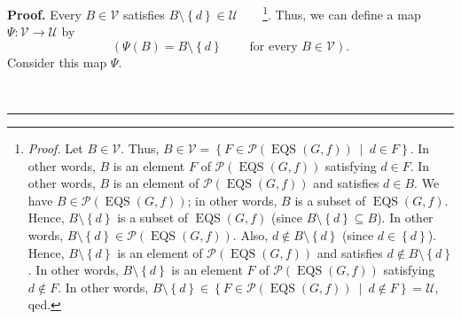 \documentclass[numbers=enddot,12pt,final,onecolumn,notitlepage]{scrartcl}%
\theoremstyle{definition}
\newenvironment{proof}[1][Proof]{\noindent\textbf{#1.} }{\ \rule{0.5em}{0.5em}}
\newenvironment{verlong}{}{}
\begin{document}
\begin{proof}
\begin{verlong}
Every $B\in\mathcal{V}$ satisfies $B\setminus\left\{  d\right\}
\in\mathcal{U}$\ \ \ \ \footnote{\textit{Proof.} Let $B\in\mathcal{V}$. Thus,
$B\in\mathcal{V}=\left\{  F\in\mathcal{P}\left(  \operatorname*{EQS}\left(
G,f\right)  \right)  \ \mid\ d\in F\right\}  $. In other words, $B$ is an
element $F$ of $\mathcal{P}\left(  \operatorname*{EQS}\left(  G,f\right)
\right)  $ satisfying $d\in F$. In other words, $B$ is an element of
$\mathcal{P}\left(  \operatorname*{EQS}\left(  G,f\right)  \right)  $ and
satisfies $d\in B$. We have $B\in\mathcal{P}\left(  \operatorname*{EQS}\left(
G,f\right)  \right)  $; in other words, $B$ is a subset of
$\operatorname*{EQS}\left(  G,f\right)  $. Hence, $B\setminus\left\{
d\right\}  $ is a subset of $\operatorname*{EQS}\left(  G,f\right)  $ (since
$B\setminus\left\{  d\right\}  \subseteq B$). In other words, $B\setminus
\left\{  d\right\}  \in\mathcal{P}\left(  \operatorname*{EQS}\left(
G,f\right)  \right)  $. Also, $d\notin B\setminus\left\{  d\right\}  $ (since
$d\in\left\{  d\right\}  $). Hence, $B\setminus\left\{  d\right\}  $ is an
element of $\mathcal{P}\left(  \operatorname*{EQS}\left(  G,f\right)  \right)
$ and satisfies $d\notin B\setminus\left\{  d\right\}  $. In other words,
$B\setminus\left\{  d\right\}  $ is an element $F$ of $\mathcal{P}\left(
\operatorname*{EQS}\left(  G,f\right)  \right)  $ satisfying $d\notin F$. In
other words, $B\setminus\left\{  d\right\}  \in\left\{  F\in\mathcal{P}\left(
\operatorname*{EQS}\left(  G,f\right)  \right)  \ \mid\ d\notin F\right\}
=\mathcal{U}$, qed.}. Thus, we can define a map $\Psi:\mathcal{V}%
\rightarrow\mathcal{U}$ by%
\[
\left(  \Psi\left(  B\right)  =B\setminus\left\{  d\right\}
\ \ \ \ \ \ \ \ \ \ \text{for every }B\in\mathcal{V}\right)  .
\]
Consider this map $\Psi$.


\end{verlong}
\end{proof}
\end{document}
